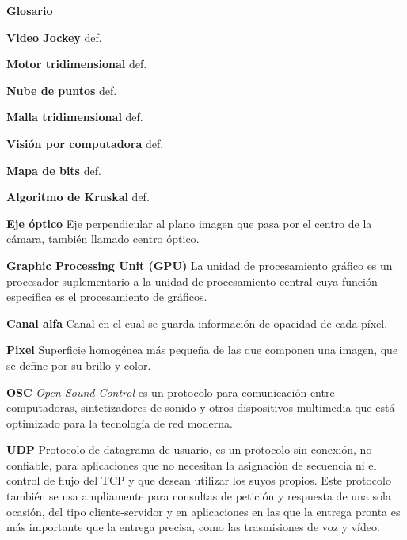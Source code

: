 ﻿\Huge
\textbf{Glosario}

\vspace{10 mm}

\normalsize 

\textbf{Video Jockey}
def. %

\textbf{Motor tridimensional}
def.
 
\textbf{Nube de puntos}
def.

\textbf{Malla tridimensional}
def.

\textbf{Visión por computadora}
def.

\textbf{Mapa de bits}
def.

\textbf{Algoritmo de Kruskal}
def.

\textbf{Eje óptico} 
Eje perpendicular al plano imagen que pasa por el centro de la cámara, también llamado centro óptico\cite{OpticalDesign}.

\textbf{Graphic Processing Unit (GPU)}
La unidad de procesamiento gráfico es un procesador suplementario a la unidad de procesamiento central cuya función especifica es el procesamiento de gráficos\cite{GPUWork}.

\textbf{Canal alfa}
Canal en el cual se guarda información de opacidad de cada píxel\cite{3DGraphics}.

\textbf{Pixel}
Superficie homogénea más pequeña de las que componen una imagen, que se define por su brillo y color\cite{RAE}.

\textbf{OSC}
\emph{Open Sound Control} es un protocolo para comunicación entre computadoras, sintetizadores de sonido y otros dispositivos multimedia que está optimizado para la tecnología de red moderna\cite{OSCProtocol}.

\textbf{UDP}
Protocolo de datagrama de usuario, es un protocolo sin conexión, no confiable, para aplicaciones que no necesitan la asignación de secuencia ni el control de flujo del TCP y que desean utilizar los suyos propios. Este protocolo también se usa ampliamente para consultas de petición y respuesta de una sola ocasión, del tipo cliente-servidor y en aplicaciones en las que la entrega pronta es más importante que la entrega precisa, como las trasmisiones de voz y vídeo\cite{Tanenbaum}.
